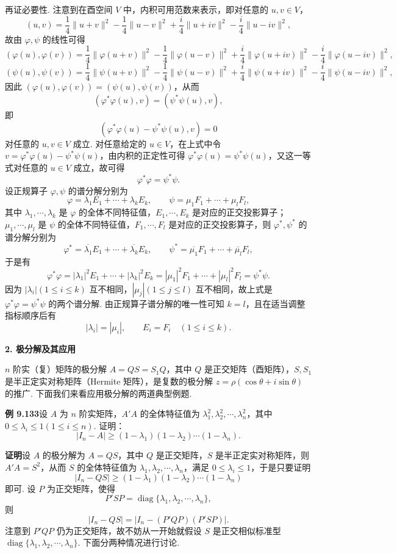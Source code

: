 \documentclass[UTF8, 12pt, fontset=fandol, oneside]{ctexart}
\begin{document}
再证必要性. 注意到在酉空间 $V$ 中，内积可用范数来表示，即对任意的 $u,v\in V$，
\[
(u,v)=\frac{1}{4}\|u+v\|^2-\frac{1}{4}\|u-v\|^2+\frac{i}{4}\|u+iv\|^2-\frac{i}{4}\|u-iv\|^2,
\]
故由 $\varphi,\psi$ 的线性可得
\[
(\varphi(u),\varphi(v))=\frac{1}{4}\|\varphi(u+v)\|^2-\frac{1}{4}\|\varphi(u-v)\|^2+\frac{i}{4}\|\varphi(u+iv)\|^2-\frac{i}{4}\|\varphi(u-iv)\|^2,
\]
\[
(\psi(u),\psi(v))=\frac{1}{4}\|\psi(u+v)\|^2-\frac{1}{4}\|\psi(u-v)\|^2+\frac{i}{4}\|\psi(u+iv)\|^2-\frac{i}{4}\|\psi(u-iv)\|^2,
\]
因此 $(\varphi(u),\varphi(v))=(\psi(u),\psi(v))$，从而
\[
(\varphi^*\varphi(u),v)=(\psi^*\psi(u),v),
\]
即
\[
(\varphi^*\varphi(u)-\psi^*\psi(u),v)=0
\]
对任意的 $u,v\in V$ 成立. 对任意给定的 $u\in V$，在上式中令 $v=\varphi^*\varphi(u)-\psi^*\psi(u)$，由内积的正定性可得 $\varphi^*\varphi(u)=\psi^*\psi(u)$，又这一等式对任意的 $u\in V$ 成立，故可得
\[
\varphi^*\varphi=\psi^*\psi.
\]
设正规算子 $\varphi,\psi$ 的谱分解分别为
\[
\varphi=\lambda_1E_1+\cdots+\lambda_kE_k,\qquad
\psi=\mu_1F_1+\cdots+\mu_lF_l,
\]
其中 $\lambda_1,\cdots,\lambda_k$ 是 $\varphi$ 的全体不同特征值，$E_1,\cdots,E_k$ 是对应的正交投影算子；$\mu_1,\cdots,\mu_l$ 是 $\psi$ 的全体不同特征值，$F_1,\cdots,F_l$ 是对应的正交投影算子，则 $\varphi^*,\psi^*$ 的谱分解分别为
\[
\varphi^*=\overline{\lambda_1}E_1+\cdots+\overline{\lambda_k}E_k,\qquad
\psi^*=\overline{\mu_1}F_1+\cdots+\overline{\mu_l}F_l,
\]
于是有
\[
\varphi^*\varphi=|\lambda_1|^2E_1+\cdots+|\lambda_k|^2E_k=|\mu_1|^2F_1+\cdots+|\mu_l|^2F_l=\psi^*\psi.
\]
因为 $|\lambda_i|(1\le i\le k)$ 互不相同，$|\mu_j|(1\le j\le l)$ 互不相同，故上式是 $\varphi^*\varphi=\psi^*\psi$ 的两个谱分解. 由正规算子谱分解的唯一性可知 $k=l$，且在适当调整指标顺序后有
\[
|\lambda_i|=|\mu_i|,\qquad E_i=F_i\quad (1\le i\le k).
\]

\noindent\textbf{2. 极分解及其应用}

$n$ 阶实（复）矩阵的极分解 $A=QS=S_1Q$，其中 $Q$ 是正交矩阵（酉矩阵），$S,S_1$ 是半正定实对称矩阵（Hermite 矩阵），是复数的极分解 $z=\rho(\cos\theta+i\sin\theta)$ 的推广. 下面我们来看应用极分解的两道典型例题.

\noindent\textbf{例 9.133}\quad 设 $A$ 为 $n$ 阶实矩阵，$A'A$ 的全体特征值为 $\lambda_1^2,\lambda_2^2,\cdots,\lambda_n^2$，其中 $0\le\lambda_i\le1(1\le i\le n)$. 证明：
\[
|I_n-A|\ge(1-\lambda_1)(1-\lambda_2)\cdots(1-\lambda_n).
\]

\noindent\textbf{证明}\quad 设 $A$ 的极分解为 $A=QS$，其中 $Q$ 是正交矩阵，$S$ 是半正定实对称矩阵，则 $A'A=S^2$，从而 $S$ 的全体特征值为 $\lambda_1,\lambda_2,\cdots,\lambda_n$，满足 $0\le\lambda_i\le1$，于是只要证明
\[
|I_n-QS|\ge(1-\lambda_1)(1-\lambda_2)\cdots(1-\lambda_n)
\]
即可. 设 $P$ 为正交矩阵，使得
\[
P'SP=\operatorname{diag}\{\lambda_1,\lambda_2,\cdots,\lambda_n\},
\]
则
\[
|I_n-QS|=|I_n-(P'QP)(P'SP)|.
\]
注意到 $P'QP$ 仍为正交矩阵，故不妨从一开始就假设 $S$ 是正交相似标准型 $\operatorname{diag}\{\lambda_1,\lambda_2,\cdots,\lambda_n\}$. 下面分两种情况进行讨论.
\end{document}
